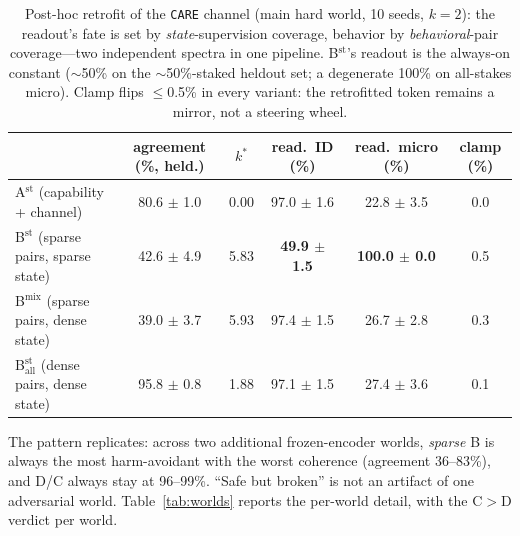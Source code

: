 \documentclass[manuscript, screen, review]{jair}
\newcommand{\care}{\texttt{CARE}}
\begin{document}
\begin{table}[t]
\centering
\caption{Post-hoc retrofit of the \care{} channel (main hard world, 10 seeds, $k{=}2$): the readout's fate is set by \emph{state}-supervision coverage, behavior by \emph{behavioral}-pair coverage---two independent spectra in one pipeline. B$^{\mathrm{st}}$'s readout is the always-on constant (${\sim}$50\% on the ${\sim}$50\%-staked heldout set; a degenerate 100\% on all-stakes micro). Clamp flips $\leq$0.5\% in every variant: the retrofitted token remains a mirror, not a steering wheel.}
\label{tab:retrofit}
\footnotesize
\setlength{\tabcolsep}{4pt}
\begin{tabular}{l c c c c c}
\toprule
 & agreement (\%, held.) & $k^*$ & read.\ ID (\%) & read.\ micro (\%) & clamp (\%) \\
\midrule
A$^{\mathrm{st}}$ (capability + channel) & 80.6 $\pm$ 1.0 & 0.00 & 97.0 $\pm$ 1.6 & 22.8 $\pm$ 3.5 & 0.0 \\
B$^{\mathrm{st}}$ (sparse pairs, sparse state) & 42.6 $\pm$ 4.9 & 5.83 & \textbf{49.9 $\pm$ 1.5} & \textbf{100.0 $\pm$ 0.0} & 0.5 \\
B$^{\mathrm{mix}}$ (sparse pairs, dense state) & 39.0 $\pm$ 3.7 & 5.93 & 97.4 $\pm$ 1.5 & 26.7 $\pm$ 2.8 & 0.3 \\
B$_{\mathrm{all}}^{\mathrm{st}}$ (dense pairs, dense state) & 95.8 $\pm$ 0.8 & 1.88 & 97.1 $\pm$ 1.5 & 27.4 $\pm$ 3.6 & 0.1 \\
\bottomrule
\end{tabular}
\end{table}

The pattern replicates: across two additional frozen-encoder worlds, \emph{sparse} B is always
the most harm-avoidant with the worst coherence (agreement 36--83\%), and D/C always stay at
96--99\%.
``Safe but broken'' is not an artifact of one adversarial world. Table~\ref{tab:worlds} reports
the per-world detail, with the C$>$D verdict per world.
\end{document}
